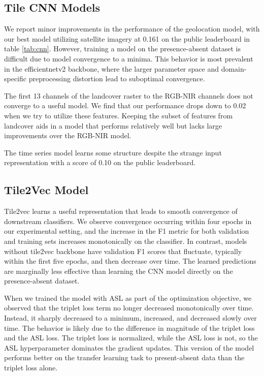 \subsection{Tile CNN Models}

We report minor improvements in the performance of the geolocation model, with our best model utilizing satellite imagery at 0.161 on the public leaderboard in table \ref{tab:cnn}.
However, training a model on the presence-absent dataset is difficult due to model convergence to a minima.
This behavior is most prevalent in the efficientnetv2 backbone, where the larger parameter space and domain-specific preprocessing distortion lead to suboptimal convergence.

The first 13 channels of the landcover raster to the RGB-NIR channels does not converge to a useful model.
We find that our performance drops down to 0.02 when we try to utilize these features.
Keeping the subset of features from landcover aids in a model that performs relatively well but lacks large improvements over the RGB-NIR model.

The time series model learns some structure despite the strange input representation with a score of 0.10 on the public leaderboard.

\subsection{Tile2Vec Model}

Tile2vec learns a useful representation that leads to smooth convergence of downstream classifiers.
We observe convergence occurring within four epochs in our experimental setting, and the increase in the F1 metric for both validation and training sets increases monotonically on the classifier.
In contrast, models without tile2vec backbone have validation F1 scores that fluctuate, typically within the first five epochs, and then decrease over time.
The learned predictions are marginally less effective than learning the CNN model directly on the presence-absent dataset.

When we trained the model with ASL as part of the optimization objective, we observed that the triplet loss term no longer decreased monotonically over time.
Instead, it sharply decreased to a minimum, increased, and decreased slowly over time.
The behavior is likely due to the difference in magnitude of the triplet loss and the ASL loss.
The triplet loss is normalized, while the ASL loss is not, so the ASL hyperparameter dominates the gradient updates.
This version of the model performs better on the transfer learning task to present-absent data than the triplet loss alone.

